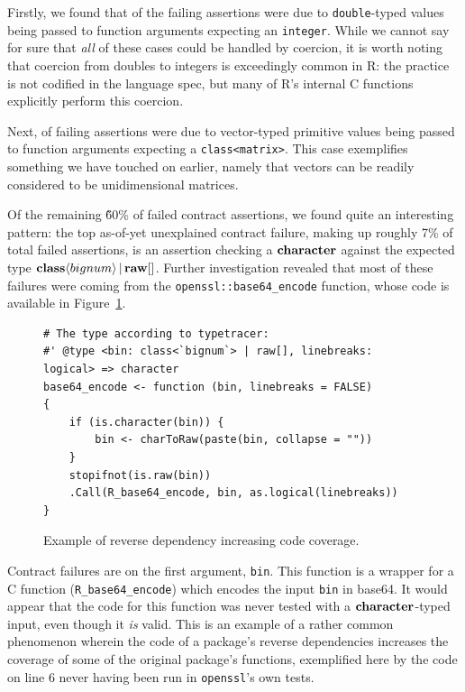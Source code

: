\documentclass[acmsmall,review,anonymous]{acmart}\settopmatter{printfolios=true,printccs=false,printacmref=false}
\newcommand{\code}[1]{{\lstinline[style=Rin]!#1!}\xspace}
\begin{document}
Firstly, we found that  of the failing assertions were due to \code{double}-typed values being passed to function arguments expecting an \code{integer}.
While we cannot say for sure that {\it all} of these cases could be handled by coercion, it is worth noting that coercion from doubles to integers is exceedingly common in R: the practice is not codified in the language spec, but many of R's internal C functions explicitly perform this coercion.

Next,  of failing assertions were due to vector-typed primitive values being passed to function arguments expecting a \code{class<matrix>}.
This case exemplifies something we have touched on earlier, namely that vectors can be readily considered to be unidimensional matrices.

Of the remaining \~60\% of failed contract assertions, we found quite an interesting pattern: the top as-of-yet unexplained contract failure, making up roughly 7\% of total failed assertions, is an assertion checking a ${\bf character}$ against the expected type ${\bf class} \langle bignum \rangle \, | \, {\bf raw}[]$.
Further investigation revealed that most of these failures were coming from the \code{openssl::base64_encode} function, whose code is available in Figure~\ref{fig:base64-encode}.

\begin{figure}[htbp]
\begin{center}

\begin{lstlisting}
# The type according to typetracer:
#' @type <bin: class<`bignum`> | raw[], linebreaks: logical> => character
base64_encode <- function (bin, linebreaks = FALSE) 
{
    if (is.character(bin)) {
        bin <- charToRaw(paste(bin, collapse = ""))
    }
    stopifnot(is.raw(bin))
    .Call(R_base64_encode, bin, as.logical(linebreaks))
}
\end{lstlisting}

\caption{Example of reverse dependency increasing code coverage.}
\label{fig:base64-encode}
\end{center}
\end{figure}

Contract failures are on the first argument, \code{bin}.
This function is a wrapper for a C function (\code{R_base64_encode}) which encodes the input \code{bin} in base64.
It would appear that the code for this function was never tested with a ${\bf character}$-typed input, even though it {\it is} valid.
This is an example of a rather common phenomenon wherein the code of a package's reverse dependencies increases the coverage of some of the original package's functions, exemplified here by the code on line 6 never having been run in \code{openssl}'s own tests.
\end{document}
